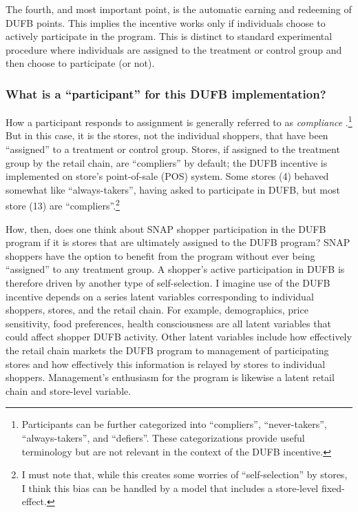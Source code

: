 \documentclass[12pt,letterpaperpaper,]{book}
\begin{document}
The fourth, and most important point, is the automatic earning and
redeeming of DUFB points. This implies the incentive works only if
individuals choose to actively participate in the program. This is
distinct to standard experimental procedure where individuals are
assigned to the treatment or control group and then choose to
participate (or not).

\subsubsection*{\texorpdfstring{What is a ``participant'' for this DUFB
implementation?}{What is a participant for this DUFB implementation?}}\label{what-is-a-participant-for-this-dufb-implementation}

How a participant responds to assignment is generally referred to as
\emph{compliance} \citep{angrist_mostly_2008}.\footnote{Participants can
  be further categorized into ``compliers'', ``never-takers'',
  ``always-takers'', and ``defiers''. These categorizations provide
  useful terminology but are not relevant in the context of the DUFB
  incentive.} But in this case, it is the stores, not the individual
shoppers, that have been ``assigned'' to a treatment or control group.
Stores, if assigned to the treatment group by the retail chain, are
``compliers'' by default; the DUFB incentive is implemented on store's
point-of-sale (POS) system. Some stores (4) behaved somewhat like
``always-takers'', having asked to participate in DUFB, but most store
(13) are ``compliers''.\footnote{I must note that, while this creates
  some worries of ``self-selection'' by stores, I think this bias can be
  handled by a model that includes a store-level fixed-effect.}

How, then, does one think about SNAP shopper participation in the DUFB
program if it is stores that are ultimately assigned to the DUFB
program? SNAP shoppers have the option to benefit from the program
without ever being ``assigned'' to any treatment group. A shopper's
active participation in DUFB is therefore driven by another type of
self-selection. I imagine use of the DUFB incentive depends on a series
latent variables corresponding to individual shoppers, stores, and the
retail chain. For example, demographics, price sensitivity, food
preferences, health consciousness are all latent variables that could
affect shopper DUFB activity. Other latent variables include how
effectively the retail chain markets the DUFB program to management of
participating stores and how effectively this information is relayed by
stores to individual shoppers. Management's enthusiasm for the program
is likewise a latent retail chain and store-level variable.
\end{document}

